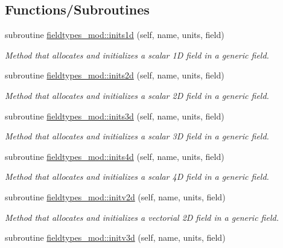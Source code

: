 \subsection*{Functions/\+Subroutines}
\begin{DoxyCompactItemize}
\item 
subroutine \mbox{\hyperlink{namespacefieldtypes__mod_a3f1571ad15733a3f2fff43e35f309416}{fieldtypes\+\_\+mod\+::inits1d}} (self, name, units, field)
\begin{DoxyCompactList}\small\item\em Method that allocates and initializes a scalar 1D field in a generic field. \end{DoxyCompactList}\item 
subroutine \mbox{\hyperlink{namespacefieldtypes__mod_ad3329e97ec60bf9226d19be45ed21859}{fieldtypes\+\_\+mod\+::inits2d}} (self, name, units, field)
\begin{DoxyCompactList}\small\item\em Method that allocates and initializes a scalar 2D field in a generic field. \end{DoxyCompactList}\item 
subroutine \mbox{\hyperlink{namespacefieldtypes__mod_a750ce2c729d98ea7031c839a3a5ebd7c}{fieldtypes\+\_\+mod\+::inits3d}} (self, name, units, field)
\begin{DoxyCompactList}\small\item\em Method that allocates and initializes a scalar 3D field in a generic field. \end{DoxyCompactList}\item 
subroutine \mbox{\hyperlink{namespacefieldtypes__mod_a1987bd94293cfd9e35016ac5992501cd}{fieldtypes\+\_\+mod\+::inits4d}} (self, name, units, field)
\begin{DoxyCompactList}\small\item\em Method that allocates and initializes a scalar 4D field in a generic field. \end{DoxyCompactList}\item 
subroutine \mbox{\hyperlink{namespacefieldtypes__mod_ad1af664e23793260f9c2fcd03829a1f5}{fieldtypes\+\_\+mod\+::initv2d}} (self, name, units, field)
\begin{DoxyCompactList}\small\item\em Method that allocates and initializes a vectorial 2D field in a generic field. \end{DoxyCompactList}\item 
subroutine \mbox{\hyperlink{namespacefieldtypes__mod_aa0a152c9e5131d3003cc34e4f3b2974d}{fieldtypes\+\_\+mod\+::initv3d}} (self, name, units, field)

\end{DoxyCompactItemize}
